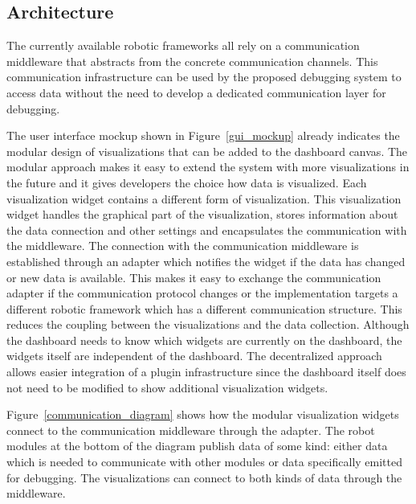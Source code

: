 \subsection{Architecture}
The currently available robotic frameworks all rely on a communication middleware that abstracts from the concrete communication channels. This communication infrastructure can be used by the proposed debugging system to access data without the need to develop a dedicated communication layer for debugging.

The user interface mockup shown in Figure~\ref{gui_mockup} already indicates the modular design of visualizations that can be added to the dashboard canvas. The modular approach makes it easy to extend the system with more visualizations in the future and it gives developers the choice how data is visualized. Each visualization widget contains a different form of visualization. This visualization widget handles the graphical part of the visualization, stores information about the data connection and other settings and encapsulates the communication with the middleware. The connection with the communication middleware is established through an adapter which notifies the widget if the data has changed or new data is available. This makes it easy to exchange the communication adapter if the communication protocol changes or the implementation targets a different robotic framework which has a different communication structure. This reduces the coupling between the visualizations and the data collection. Although the dashboard needs to know which widgets are currently on the dashboard, the widgets itself are independent of the dashboard. The decentralized approach allows easier integration of a plugin infrastructure since the dashboard itself does not need to be modified to show additional visualization widgets.

Figure~\ref{communication_diagram} shows how the modular visualization widgets connect to the communication middleware through the adapter. The robot modules at the bottom of the diagram publish data of some kind: either data which is needed to communicate with other modules or data specifically emitted for debugging. The visualizations can connect to both kinds of data through the middleware.

